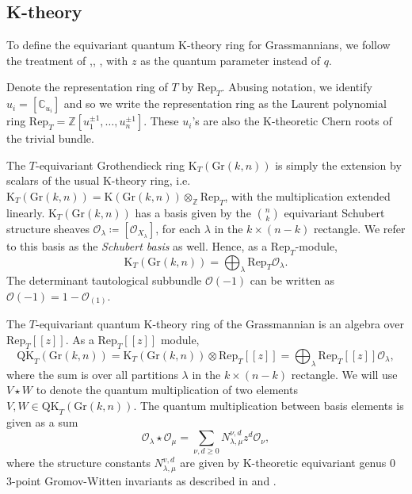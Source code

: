 \documentclass[12pt]{article}
\newcommand{\OC}{\mathcal{O}}
\newcommand{\bb}[1]{\mathbb{#1}}
\theoremstyle{plain}
\newcommand{\Z}{\mathbb{Z}}
\theoremstyle{definition}
\begin{document}
\subsection{K-theory}
To define the equivariant quantum K-theory ring for Grassmannians, we follow the treatment of \cite{mihalcealectures},\cite{Buch_2011}, \cite{gorbounov2025quantumktheorygrassmanniansyangbaxter}, with $z$ as the quantum parameter instead of $q$.
 
Denote the representation ring of $T$ by $\text{Rep}_T$. Abusing notation, we identify $u_i = [\bb{C}_{u_i}]$ and so we write the representation ring as the Laurent polynomial ring $\text{Rep}_T = \bb{Z}[u_1 ^{\pm 1} ,\dots, u_n ^{\pm 1}]$. These $u_i$'s are also the K-theoretic Chern roots of the trivial bundle. 


The $T$-equivariant Grothendieck ring $\textrm{K}_T(\textrm{Gr}(k,n))$ is simply the extension by scalars of the usual K-theory ring, i.e. $\mathrm{K}_T (\mathrm{Gr}(k,n)) = \mathrm{K} ( \mathrm{Gr}(k,n)) \otimes_\Z \mathrm{Rep}_T$, with the multiplication extended linearly. $\mathrm{K}_T ( \mathrm{Gr}(k,n) )$ has a basis given by the $\binom{n}{k}$ equivariant Schubert structure sheaves $\OC_\lambda \coloneq [\OC_{X_\lambda}]$, for each $\lambda$ in the $k\times (n-k)$ rectangle. We refer to this basis as the \emph{Schubert basis} as well. Hence, as a $\mathrm{Rep}_T$-module, 
$$
\textrm{K}_T(\textrm{Gr}(k,n))=\bigoplus_\lambda \text{Rep}_T \OC_\lambda.
$$ 
The determinant tautological subbundle $\OC(-1)$ can be written as $\OC(-1) = 1-\OC_{(1)}.$
 
The $T$-equivariant quantum K-theory ring of the Grassmannian is an algebra over $\text{Rep}_T [[z]]$. As a $\text{Rep}_T [[z]]$ module,
$$
\mathrm{QK}_T(\mathrm{Gr}(k,n))  = \mathrm{K}_T(\mathrm{Gr}(k,n)) \otimes \mathrm{Rep}_T [[z]] = \bigoplus_{\lambda} \mathrm{Rep}_T [[z]] \OC_\lambda,
$$
where the sum is over all partitions $\lambda$ in the $k \times (n-k)$ rectangle. We will use $V \star W$ to denote the quantum multiplication of two elements $V, W \in \mathrm{QK}_T ( \mathrm{Gr}(k,n) )$. The quantum multiplication between basis elements is given as a sum 
$$
\OC_\lambda \star \OC_\mu = \sum \limits_{\nu, d \geq 0} N_{\lambda, \mu} ^{\nu, d} z^d \OC_\nu,
$$
where the structure constants $N^{v,d} _{\lambda, \mu}$ are given by K-theoretic equivariant genus 0 3-point Gromov-Witten invariants as described in \cite{Buch_2011} and \cite{givental1996equivariantgromovwitten}.
\end{document}
